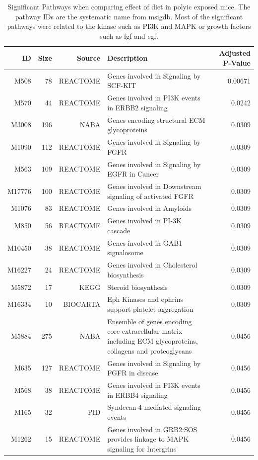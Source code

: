 \begin{landscape}
	\begin{table}
		\begin{tabular}{rrrp{10cm}r}
			\toprule
			ID&	Size&	Source&	Description&	Adjusted P-Value\\
			\midrule
			M508&	78&	REACTOME&	Genes involved in Signaling by SCF-KIT&	0.00671\\
			M570&	44&	REACTOME&	Genes involved in PI3K events in ERBB2 signaling&	0.0242\\
			M3008&	196&	NABA&	Genes encoding structural ECM glycoproteins&	0.0309\\
			M1090&	112&	REACTOME&	Genes involved in Signaling by FGFR&	0.0309\\
			M563&	109&	REACTOME&	Genes involved in Signaling by EGFR in Cancer&	0.0309\\
			M17776&	100&	REACTOME&	Genes involved in Downstream signaling of activated FGFR&	0.0309\\
			M1076&	83&	REACTOME&	Genes involved in Amyloids&	0.0309\\
			M850&	56&	REACTOME&	Genes involved in PI-3K cascade&	0.0309\\
			M10450&	38&	REACTOME&	Genes involved in GAB1 signalosome&	0.0309\\
			M16227&	24&	REACTOME&	Genes involved in Cholesterol biosynthesis&	0.0309\\
			M5872&	17&	KEGG&	Steroid biosynthesis&	0.0309\\
			M16334&	10&	BIOCARTA&	Eph Kinases and ephrins support platelet aggregation&	0.0309\\
			M5884&	275&	NABA&	Ensemble of genes encoding core extracellular matrix including ECM glycoproteins, collagens and proteoglycans&	0.0456\\
			M635&	127&	REACTOME&	Genes involved in Signaling by FGFR in disease&	0.0456\\
			M568&	38&	REACTOME&	Genes involved in PI3K events in ERBB4 signaling&	0.0456\\
			M165&	32&	PID&	Syndecan-4-mediated signaling events&	0.0456\\
			M1262&	15&	REACTOME&	Genes involved in GRB2:SOS provides linkage to MAPK signaling for Intergrins&	0.0456\\
			\bottomrule
		\end{tabular}
		\caption[Significant Pathways When Comparing Effect of Diet in PolyI:C Exposed Mouse]{Significant Pathways when comparing effect of diet in \gls{polyic} exposed mice.
			The pathway IDs are the systematic name from \gls{msigdb}.
			Most of the significant pathways were related to the kinase such as PI3K and MAPK or growth factors such as \gls{fgf} and \gls{egf}.
			}
			\label{tab:o6polyPath}
	\end{table}
	

\end{landscape}
